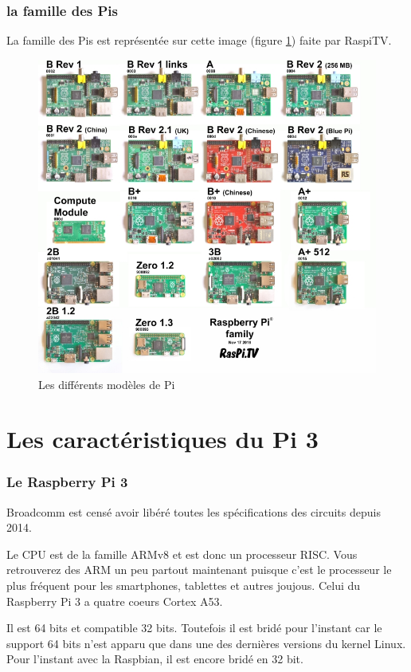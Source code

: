 \begin{frame}
\frametitle{la famille des Pis}
La famille des Pis est représentée sur cette image (figure \ref{img_family}) faite par RaspiTV.

\begin{center}
\begin{figure}
	\includegraphics{images/pi-family}
	\caption{Les différents modèles de Pi}
	\label{img_family}
\end{figure}
\end{center}

\end{frame}

\section{Les caractéristiques du Pi 3}

\begin{frame}
\frametitle{Le Raspberry Pi 3}

Broadcomm est censé avoir libéré toutes les spécifications des circuits depuis 2014.

Le CPU est de la famille ARMv8 et est donc un processeur RISC. Vous retrouverez des ARM un peu partout maintenant puisque c'est le processeur le plus fréquent pour les smartphones, tablettes et autres joujous. Celui du Raspberry Pi 3 a quatre coeurs Cortex A53.

Il est 64 bits et compatible 32 bits. Toutefois il est bridé pour l'instant car le support 64 bits n'est apparu que dans une des dernières versions du kernel Linux. Pour l'instant avec la Raspbian, il est encore bridé en 32 bit.

\end{frame}

